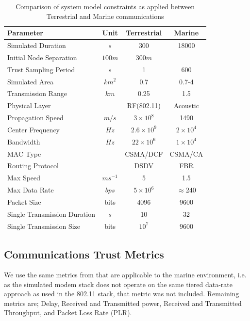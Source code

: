\documentclass{aamas2016}
\begin{document}
%
\begin{table}[h]
	\caption{Comparison of system model constraints as applied between Terrestrial and Marine communications} \label{tab:sysconstraints}
	\begin{center}
		\setlength{\tabcolsep}{8pt}
		\begin{tabular}{lccc}
			\hline
			Parameter & Unit & Terrestrial & Marine \\
			\hline
			Simulated Duration & $s$ & 300 & 18000\\
			Initial Node Separation & $100m$ & $300m$\\
			Trust Sampling Period & $s$ & 1 & 600 \\
			Simulated Area & $km^2$ & 0.7 & 0.7-4 \\
			Transmission Range & $km$ & 0.25 & 1.5 \\
			Physical Layer & & RF(802.11) & Acoustic\\
			Propagation Speed& $m/s$ & $3\times10^8$ & 1490\\
			Center Frequency& $Hz$ & $2.6\times10^9$ & $2 \times 10^4$ \\
			Bandwidth& $Hz$ & $22\times10^6$ & $1\times10^4$\\
			MAC Type & & CSMA/DCF & CSMA/CA\\
			Routing Protocol & & DSDV & FBR \\
			Max Speed & $ms^{-1}$ & 5 & 1.5 \\
			Max Data Rate & $bps$ & $5\times10^6$ & $\approx 240$ \\
			Packet Size & bits & 4096 &  9600 \\
			Single Transmission Duration & $s$ & 10 & 32 \\
			Single Transmission Size & bits & $10^7$ & $9600$ \\
			\hline
		\end{tabular}
		\setlength{\tabcolsep}{6pt}
	\end{center}
\end{table}
%

\subsection{Communications Trust Metrics}

We use the same metrics from \cite{Guo2012} that are applicable to the marine environment, i.e. as the simulated modem stack does not operate on the same tiered data-rate approach as used in the 802.11 stack, that metric was not included. Remaining metrics are; Delay, Received and Transmitted power, Received and Transmitted Throughput, and Packet Loss Rate (PLR).
\end{document}
